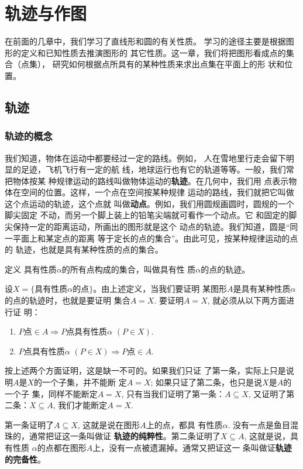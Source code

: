 \chapter{轨迹与作图}
在前面的几章中，我们学习了直线形和圆的有关性质。
学习的途径主要是根据图形的定义和已知性质去推演图形的
其它性质。这一章，我们将把图形看成点的集合（点集），
研究如何根据点所具有的某种性质来求出点集在平面上的形
状和位置。

\section{轨迹}
\subsection{轨迹的概念}
我们知道，物体在运动中都要经过一定的路线。例如，
人在雪地里行走会留下明显的足迹，飞机飞行有一定的航
线，地球运行也有它的轨道等等。一般，我们常把物体按某
种规律运动的路线叫做物体运动的\textbf{轨迹}。在几何中，我们用
点表示物体在空间的位置。这样，一个点在空间按某种规律
运动的路线，我们就把它叫做这个点运动的轨迹，这个点就
叫做\textbf{动点}。例如，我们用圆规画圆时，圆规的一个脚尖固定
不动，而另一个脚上装上的铅笔尖端就可看作一个动点。它
和固定的脚尖保持一定的距离运动，所画出的图形就是这个
动点的轨迹。我们知道，圆是“同一平面上和某定点的距离
等于定长的点的集合”。由此可见，按某种规律运动的点的
轨迹，也就是具有某种性质的点的集合。

\begin{blk}{定义}
具有性质$\alpha$的所有点构成的集合，叫做具有性
质$\alpha$的点的轨迹。
\end{blk}

设$X=\{\text{具有性质$\alpha$的点}\}$。由上述定义，当我们要证明
某图形$A$是具有某种性质$\alpha$的点的轨迹时，也就是要证明
集合$A=X$. 要证明$A=X$, 就必须从以下两方面进行证
明：
\begin{enumerate}
\item $P$点$\in A\Rightarrow P$点具有性质$\alpha$ $(P\in X)$.
\item $P$点具有性质$\alpha$ $(P\in X)\Rightarrow P$点$\in A$.
\end{enumerate}

按上述两个方面证明，这是缺一不可的。如果我们只证
了第一条，实际上只是说明$A$是$X$的一个子集，并不能断
定$A=X$; 如果只证了第二条，也只是说$X$是$A$的一个子
集，同样不能断定$A=X$, 只有当我们证明了第一条：$A\subseteq
X$, 又证明了第二条：$X\subseteq A$, 我们才能断定$A=X$.

第一条证明了$A\subseteq X$, 这就是说在图形$A$上的点，都具
有性质$\alpha$. 没有一点是鱼目混珠的，通常把证这一条叫做证
\textbf{轨迹的纯粹性}。第二条证明了$X\subseteq A$, 这就是说，具有性质
$\alpha$的点都在图形$A$上，没有一点被遗漏掉。通常又把证这一
条叫做证\textbf{轨迹的完备性}。

